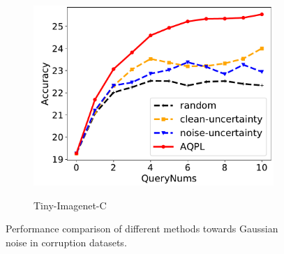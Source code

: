 \documentclass[letterpaper]{article} %
\begin{document}
\begin{figure}[!t]
	\begin{subfigure}{0.3\linewidth}
		\centering
		\label{fig.TinyImagenet.Gaussian}
		\includegraphics[width=1\textwidth]{img/Resnet18-TinyImageNet-GuassianNoise.pdf}\\
		\caption{Tiny-Imagenet-C}
	\end{subfigure}
	
	\caption{Performance comparison of different methods towards Gaussian noise in corruption datasets.}
	\label{fig.comp.Gaussian}
\end{figure}
\end{document}
